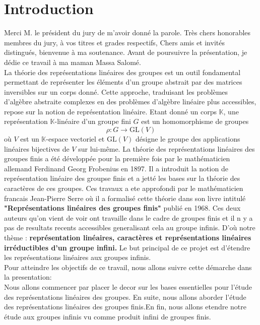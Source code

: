 \documentclass[a4paper, 14pt]{report}
\begin{document}
\section{Introduction}
Merci M. le président du jury de m’avoir donné la parole.
Très chers honorables membres du jury, à vos titres et grades respectifs,
Chers amis et invités distingués, bienvenue à ma soutenance.
Avant de poursuivre la présentation, je dédie ce travail à ma maman Massa Salomé.\\

La théorie des représentations linéaires des groupes est un outil fondamental permettant de représenter les éléments d’un groupe abstrait par des matrices inversibles sur un corps donné. Cette approche, traduisant les problèmes d’algèbre abstraite complexes en des problèmes d’algèbre linéaire plus accessibles, repose sur la notion de représentation linéaire. Etant donné un corps $\mathbb{K}$, une représentation $\mathbb{K}$-linéaire d’un groupe fini $G$ est un homomorphisme de groupes \[ \rho : G \to \text{GL}(V) \]
où $V$ est un $\mathbb{K}$-espace vectoriel et $\text{GL}(V)$ désigne le groupe des applications linéaires bijectives de $V$ sur lui-même. 
La théorie des représentations linéaires des groupes finis a été développée pour la première fois par le mathématicien allemand Ferdinand Georg Frobenius en 1897. Il a introduit la notion de représentation linéaire des groupse finis et a jetté les bases sur la théorie des caractères de ces groupes. Ces travaux a ete approfondi par le mathématicien francais Jean-Pierre Serre où il a formalisé cette théorie dans son livre intitulé \textbf{"Représentations linéaires des groupes finis"} publié en 1968. Ces deux auteurs qu'on vient de voir ont travaille dans le cadre de groupes finis et il n y a pas de resultats recents accessibles generalisant cela au groupe infinis. D'où notre thème : \textbf{représentation linéaires, caractères et représentations linéaires irréductibles d'un groupe infini.}
Le but principal de ce projet est d’étendre les représentations linéaires aux groupes infinis.\\

Pour atteindre les objectifs de ce travail, nous allons suivre cette démarche dans la presentation: \\
Nous allons commencer par placer le decor sur les bases essentielles pour l’étude des représentations linéaires des groupes. En suite, nous allons aborder l’étude des représentations linéaires des groupes finis.En fin, nous allons etendre notre étude aux groupes infinis vu comme produit infini de groupes finis.	
	
\end{document}
